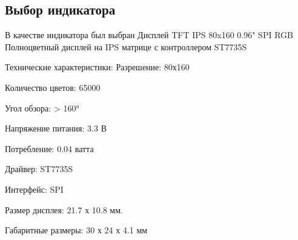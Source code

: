 \begin{sloppypar}


\subsection{Выбор индикатора}

В качестве индикатора был выбран Дисплей TFT IPS 80x160 0.96" SPI RGB
Полноцветный дисплей на IPS матрице с контроллером ST7735S

Технические характеристики:
Разрешение: 80х160


Количество цветов: 65000


Угол обзора: > 160°


Напряжение питания: 3.3 В


Потребление: 0.04 ватта


Драйвер: ST7735S


Интерфейс: SPI


Размер дисплея: 21.7 х 10.8 мм.


Габаритные размеры: 30 х 24 х 4.1 мм







\end{sloppypar}
